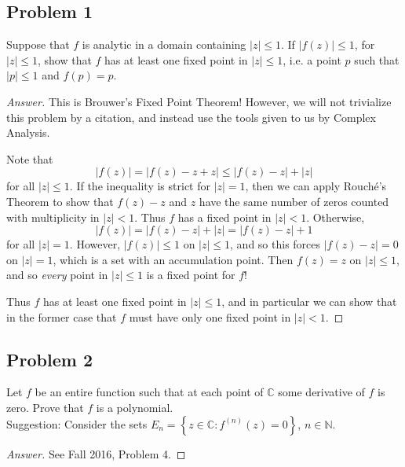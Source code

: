 \documentclass[12pt]{article}
\newcommand{\n}{\mathbb{N}}
\newcommand{\cx}{\mathbb{C}}
\newcommand{\ita}[1]{\textit{#1}}
\newcommand\setb[1]{\left \{ #1 \right \}}
\newcommand{\abs}[1]{\left| #1 \right|}
\theoremstyle{definition}
\begin{document}
\subsection{Problem 1 \texorpdfstring{\cite{Joel}}{}}
Suppose that $f$ is analytic in a domain containing $\abs{ z } \leq 1$. If $\abs{ f(z) } \leq 1$, for $\abs{ z } \leq 1$, show that $f$ has at least one fixed point in $\abs{ z } \leq 1$, i.e. a point $p$ such that $\abs{ p } \leq 1$ and $f(p) = p$.
\begin{proof}[Answer]
    This is Brouwer's Fixed Point Theorem! However, we will not trivialize this problem by a citation, and instead use the tools given to us by Complex Analysis. 
    
    Note that 
    \[
        \abs{f(z)} = \abs{ f(z) - z + z } \leq \abs{ f(z) - z } + \abs{ z } 
    \]
    for all $\abs{z} \leq 1$. If the inequality is strict for $\abs{z} = 1$, then we can apply Rouch\'e's Theorem to show that $f(z) - z$ and $z$ have the same number of zeros counted with multiplicity in $\abs{z} < 1$. Thus $f$ has a fixed point in $\abs{z} < 1$. Otherwise, 
    \[
        \abs{f(z)} = \abs{f(z) - z} + \abs{z} = \abs{f(z)-z} + 1 
    \]
    for all $\abs{z} = 1$. However, $\abs{f(z)} \leq 1$ on $\abs{z} \leq 1$, and so this forces $\abs{f(z) - z} = 0$ on $\abs{z} = 1$, which is a set with an accumulation point. Then $f(z) = z$ on $\abs{z} \leq 1$, and so \ita{every} point in $\abs{z} \leq 1$ is a fixed point for $f$! 
    
    Thus $f$ has at least one fixed point in $\abs{z} \leq 1$, and in particular we can show that in the former case that $f$ must have only one fixed point in $\abs{z} < 1$. 
\end{proof}
\subsection{Problem 2 \texorpdfstring{\cite{Melody}}{}}
Let $f$ be an entire function such that at each point of $\cx$ some derivative of $f$ is zero. Prove that $f$ is a polynomial.\\
\noindent Suggestion: Consider the sets $E_n = \setb{ z \in \cx : f^{(n)}(z) = 0 }$, $n \in \n$.
\begin{proof}[Answer]
    See Fall 2016, Problem 4.
\end{proof}
\end{document}
